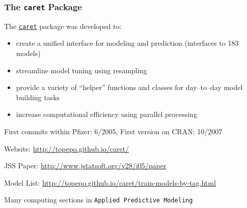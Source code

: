 \documentclass[12 pt]{beamer}\usepackage[]{graphicx}\usepackage[]{color}
\newcommand{\pkg}[1]{{\fontseries{b}\selectfont #1}}
\renewcommand{\pkg}[1]{{\color{darkgreen}\texttt{#1}}}
\begin{document}
  \begin{frame}[fragile]
\frametitle{The \pkg{caret} Package}

The \href{http://cran.r-project.org/web/packages/caret/index.html}{\pkg{caret}}  package was developed to:
  \begin{itemize}
\item create a unified interface for modeling and prediction
(interfaces to 183 models)
\item streamline model tuning using resampling
\item provide a variety of ``helper'' functions and classes for day--to--day model building tasks
\item increase computational efficiency using parallel processing
\end{itemize}

\vspace{.08in}

First commits within Pfizer: 6/2005, First version on CRAN: 10/2007

\vspace{.06in}

Website: \href{http://topepo.github.io/caret/}{http://topepo.github.io/caret/}

\vspace{.06in}

JSS Paper: \href{http://www.jstatsoft.org/v28/i05/paper}{http://www.jstatsoft.org/v28/i05/paper}

\vspace{.06in}

Model List: \href{http://topepo.github.io/caret/train-models-by-tag.html}{http://topepo.github.io/caret/train-models-by-tag.html}

\vspace{.06in}

Many computing sections in {\tt Applied Predictive Modeling}

\end{frame}



\end{document}
